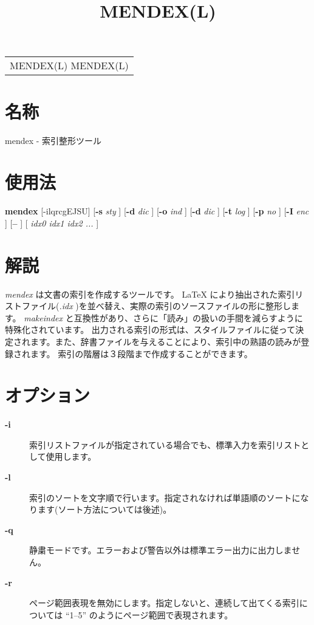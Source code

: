 \documentclass[10pt,dvipdfmx]{jsarticle}
\title{ MENDEX(L)}
\begin{document}
\begin{tabular}{c}
 MENDEX(L) MENDEX(L)

\end{tabular}

\section*{名称}
 mendex - 索引整形ツール\section*{使用法}
\textbf{mendex}
 [-ilqrcgEJSU] [\textbf{-s}
\emph{ sty}
] [\textbf{-d}
\emph{ dic}
] [\textbf{-o}
\emph{ ind}
] [\textbf{-d}
\emph{ dic}
] [\textbf{-t}
\emph{ log}
] [\textbf{-p}
\emph{ no}
] [\textbf{-I}
\emph{ enc}
] [\textbf{--}
] [\emph{ idx0 idx1 idx2 ...}
]\section*{解説}
\emph{mendex}
 は文書の索引を作成するツールです。 LaTeX により抽出された索引リストファイル(\emph{.idx}
)を並べ替え、実際の索引のソースファイルの形に整形します。 \emph{makeindex}
 と互換性があり、さらに「読み」の扱いの手間を減らすように特殊化されています。 出力される索引の形式は、スタイルファイルに従って決定されます。また、辞書ファイルを与えることにより、索引中の熟語の読みが登録されます。 索引の階層は３段階まで作成することができます。\section*{オプション}
\begin{description}
\item[\textbf{-i}
] 索引リストファイルが指定されている場合でも、標準入力を索引リストとして使用します。

\end{description}
\begin{description}
\item[\textbf{-l}
] 索引のソートを文字順で行います。指定されなければ単語順のソートになります(ソート方法については後述)。

\end{description}
\begin{description}
\item[\textbf{-q}
] 静粛モードです。エラーおよび警告以外は標準エラー出力に出力しません。

\end{description}
\begin{description}
\item[\textbf{-r}
] ページ範囲表現を無効にします。指定しないと、連続して出てくる索引については ``1--5'' のようにページ範囲で表現されます。

\end{description}
\end{document}
